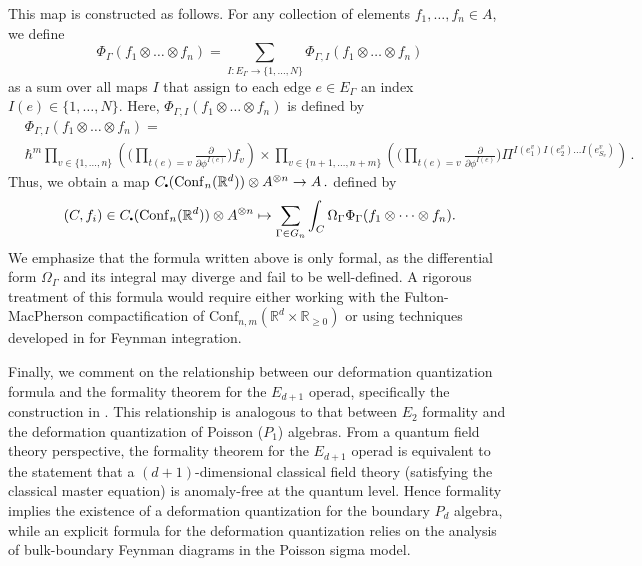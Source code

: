 \documentclass[11pt]{article}
\newcommand{\R}{\mathbb{R}}
\newcommand\sbullet[1][.5]{\mathbin{\vcenter{\hbox{\scalebox{#1}{$\bullet$}}}}}
\numberwithin{equation}{section}
\begin{document}
This map is constructed as follows. For any collection of elements $f_1, \dots, f_n \in A$, we define
\begin{equation}
	\Phi_\Gamma(f_1\otimes\dots\otimes f_n) = \sum_{I:E_\Gamma \to \{1,\dots,N\}}\Phi_{\Gamma,I}(f_1\otimes\dots\otimes f_n)
\end{equation}
as a sum over all maps $I$ that assign to each edge $e \in E_{\Gamma}$ an index $I(e) \in \{1,\dots,N\}$. Here, $\Phi_{\Gamma,I}(f_1\otimes\dots\otimes f_n)$ is defined by
\begin{equation}
\begin{aligned}
		&\Phi_{\Gamma,I}(f_1\otimes\dots\otimes f_n)  =  \\
		&\hbar^m\prod_{v \in \{1,\dots,n\}}\left(\Big(\prod_{t(e) = v} \frac{\partial}{\partial \phi^{I(e)}}\Big)f_v \right)\times  \prod_{v \in \{n+1,\dots,n+m\}}\left(\Big(\prod_{t(e) = v} \frac{\partial}{\partial \phi^{I(e)}}\Big) \Pi^{I(e^v_{1})I(e^v_{2})\dots I(e^{v}_{S_v})} \right)\,.
\end{aligned}
\end{equation}
Thus, we obtain a map $
	C_{\sbullet}(\mathrm{Conf}_{n}(\R^d))\otimes A^{\otimes n} \to A \,.
$ defined by
\begin{equation}
	(C, f_i)\in C_{\sbullet}(\mathrm{Conf}_{n}(\R^d))\otimes A^{\otimes n} \mapsto \sum_{\Gamma \in G_n}\int_{C}\Omega_{\Gamma}\Phi_{\Gamma}(f_1\otimes\dots\otimes f_n).
\end{equation}
We emphasize that the formula written above is only formal, as the differential form $\Omega_{\Gamma}$ and its integral may diverge and fail to be well-defined. A rigorous treatment of this formula would require either working with the Fulton-MacPherson compactification of $\mathrm{Conf}_{n,m}(\R^d\times \R_{\geq 0})$ or using techniques developed in \cite{budzik2023feynman,wang2024factorization} for Feynman integration.

Finally, we comment on the relationship between our deformation quantization formula and the formality theorem for the $E_{d+1}$ operad, specifically the construction in \cite{kontsevich1999operads}. This relationship is analogous to that between $E_2$ formality and the deformation quantization of Poisson ($P_1$) algebras. From a quantum field theory perspective, the formality theorem for the $E_{d+1}$ operad is equivalent to the statement that a $(d+1)$-dimensional classical field theory (satisfying the classical master equation) is anomaly-free at the quantum level. Hence formality implies the existence of a deformation quantization for the boundary $P_d$ algebra, while an explicit formula for the deformation quantization relies on the analysis of bulk-boundary Feynman diagrams in the Poisson sigma model.
\end{document}
